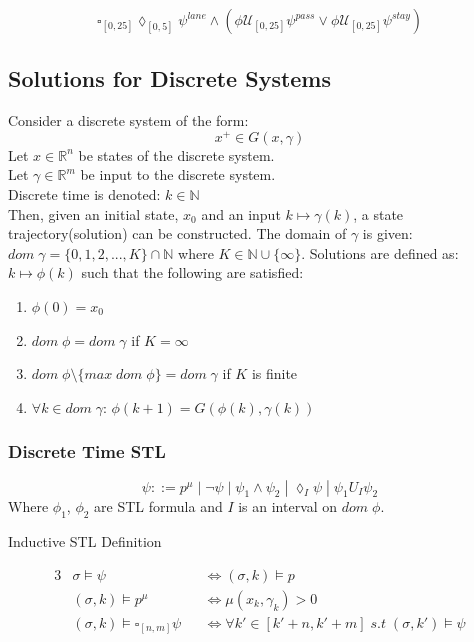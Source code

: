 \documentclass{article}
\theoremstyle{definition}
\begin{document}
\begin{equation}
    \square_{[0,25]}\lozenge_{[0,5]}\psi^{lane} \land (\phi\mathcal{U}_{[0,25]}\psi^{pass} \lor \phi\mathcal{U}_{[0,25]}\psi^{stay})
\end{equation}


\subsection{Solutions for Discrete Systems}
Consider a discrete system of the form:
\begin{equation}
    x^{+} \in G(x,\gamma)
\end{equation}
Let $x \in \mathbb{R}^n$ be states of the discrete system.\\
Let $\gamma \in \mathbb{R}^m$ be input to the discrete system. \\
Discrete time is denoted: $k \in \mathbb{N}$\\
Then, given an initial state, $x_0$ and an input $k \mapsto \gamma(k)$, a state trajectory(solution)
can be constructed. The domain of $\gamma$ is given: $dom\;\gamma = \{0,1,2,...,K\}\cap \mathbb{N}$ where $K \in \mathbb{N} \cup \{\infty\}$. Solutions are defined as: $k \mapsto \phi(k)$ such that the following are satisfied:
\begin{enumerate}
    \item $\phi(0) = x_0$
    \item $dom\;\phi = dom\;\gamma$ if $K=\infty$
    \item $dom\;\phi \setminus \{max\; dom\;\phi\} = dom\;\gamma$ if $K$ is finite
    \item $\forall k \in dom\;\gamma$: $\phi(k+1) = G(\phi(k),\gamma(k))$
\end{enumerate}
\subsubsection{Discrete Time STL}
\begin{equation}
    \psi ::= p^\mu\;|\;\lnot \psi\;|\;\psi_1 \land \psi_2\;|\;\lozenge_{I} \psi\;|\;\psi_1 U_{I} \psi_2
\end{equation}
Where $\phi_1$, $\phi_2$ are STL formula and $I$ is an interval on $dom\;\phi$.

\begin{center}
    Inductive STL Definition
\end{center}
\begin{alignat*}{3}
            &\sigma \models \psi &&\Leftrightarrow (\sigma, k) \models p \\
            &(\sigma, k) \models p^\mu \quad &&\Leftrightarrow \mu(x_k, \gamma_k) > 0\\
            &(\sigma, k) \models \square_{[n,m]} \psi &&\Leftrightarrow \forall k' \in [k' + n, k' + m]\;s.t\;(\sigma, k') \models \psi
\end{alignat*}






\end{document}
